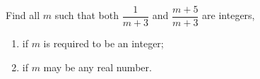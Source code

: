 Find all $m$ such that both $\dfrac{1}{m+3}$ and $\dfrac{m+5}{m+3}$ are integers,
\begin{enumerate}
\item[(a)] if $m$ is required to be an integer;
\item[(b)] if $m$ may be any real number.
\end{enumerate}
